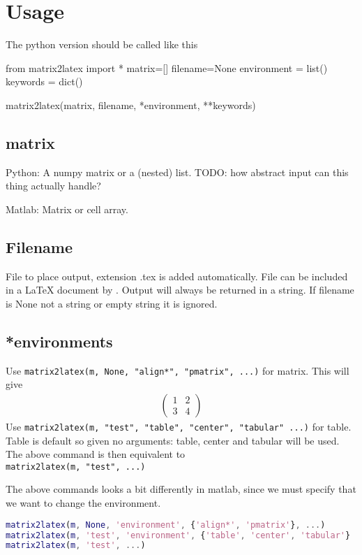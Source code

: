 \section{Usage}
The python version should be called like this
\begin{sagesilent}
from matrix2latex import *
matrix=[]
filename=None
environment = list()
keywords = dict()
\end{sagesilent}
\begin{pygments}
matrix2latex(matrix, filename, *environment, **keywords)
\end{pygments}

  
\subsection{matrix}
  Python: A numpy matrix or a (nested) list. TODO: how abstract input can this thing actually handle?

Matlab: Matrix or cell array.

\subsection{Filename}
  File to place output, extension .tex is added automatically. File can be included in a LaTeX
  document by \verb!!. Output will always be returned in a string. If filename is None
  not a string or empty string it is ignored.
  
\subsection{*environments}
  Use 
\lstinline{matrix2latex(m, None, "align*", "pmatrix", ...)} for matrix.
  This will give
  \begin{align*}
    \begin{pmatrix}
      1 & 2 \\
      3 & 4
    \end{pmatrix}
  \end{align*}
  Use 
\lstinline{matrix2latex(m, "test", "table", "center", "tabular" ...)} for table.
  Table is default so given no arguments: table, center and tabular will be used.
  The above command is then equivalent to \\
\lstinline{matrix2latex(m, "test", ...)}

The above commands looks a bit differently in matlab, since we must specify
that we want to change the environment.
\begin{lstlisting}[language=matlab, basicstyle=\small\rmfamily, stringstyle=\mdseries]
matrix2latex(m, None, 'environment', {'align*', 'pmatrix'}, ...)
matrix2latex(m, 'test', 'environment', {'table', 'center', 'tabular'} ...)
matrix2latex(m, 'test', ...)
\end{lstlisting}

